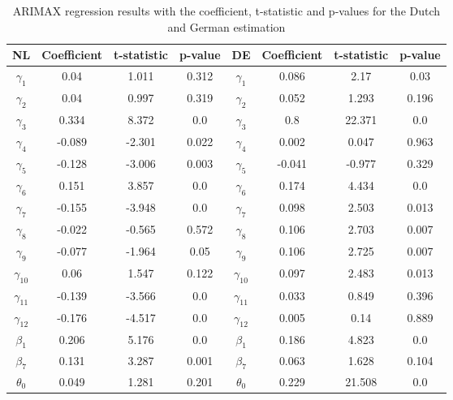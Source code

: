 \begin{table}[]
    \centering
    \begin{tabular}{|c|c c c||c|c c c|}\hline
        NL & Coefficient & t-statistic & p-value & DE & Coefficient & t-statistic & p-value\\\hline
        $\gamma_{1}$ & 0.04 & 1.011 & 0.312 & $\gamma_{1}$ & 0.086 & 2.17 & 0.03\\
        $\gamma_{2}$ & 0.04 & 0.997 & 0.319 & $\gamma_{2}$ & 0.052 & 1.293 & 0.196\\
        $\gamma_{3}$ & 0.334 & 8.372 & 0.0 & $\gamma_{3}$ & 0.8 & 22.371 & 0.0\\
        $\gamma_{4}$ & -0.089 & -2.301 & 0.022 & $\gamma_{4}$ & 0.002 & 0.047 & 0.963\\
        $\gamma_{5}$ & -0.128 & -3.006 & 0.003 & $\gamma_{5}$ & -0.041 & -0.977 & 0.329\\
        $\gamma_{6}$ & 0.151 & 3.857 & 0.0 & $\gamma_{6}$ & 0.174 & 4.434 & 0.0\\
        $\gamma_{7}$ & -0.155 & -3.948 & 0.0 & $\gamma_{7}$ & 0.098 & 2.503 & 0.013\\
        $\gamma_{8}$ & -0.022 & -0.565 & 0.572 & $\gamma_{8}$ & 0.106 & 2.703 & 0.007\\
        $\gamma_{9}$ & -0.077 & -1.964 & 0.05 & $\gamma_{9}$ & 0.106 & 2.725 & 0.007\\
        $\gamma_{10}$ & 0.06 & 1.547 & 0.122 & $\gamma_{10}$ & 0.097 & 2.483 & 0.013\\
        $\gamma_{11}$ & -0.139 & -3.566 & 0.0 & $\gamma_{11}$ & 0.033 & 0.849 & 0.396\\
        $\gamma_{12}$ & -0.176 & -4.517 & 0.0 & $\gamma_{12}$ & 0.005 & 0.14 & 0.889\\
        $\beta_{1}$ & 0.206 & 5.176 & 0.0 &$\beta_{1}$ & 0.186 & 4.823 & 0.0\\
        $\beta_{7}$ & 0.131 & 3.287 & 0.001 & $\beta_{7}$ & 0.063 & 1.628 & 0.104\\
        $\theta_{0}$ & 0.049 & 1.281 & 0.201 & $\theta_0$ & 0.229 & 21.508 & 0.0\\\hline
    \end{tabular}
    \caption{ARIMAX regression results with the coefficient, t-statistic and p-values for the Dutch and German estimation}
    \label{tab:arimax_estimation}
\end{table}

